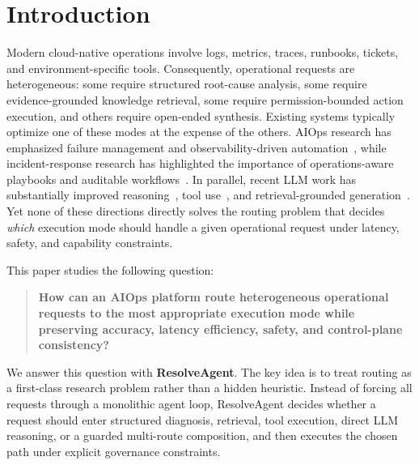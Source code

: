 \documentclass[conference]{IEEEtran}
\begin{document}
\section{Introduction}
Modern cloud-native operations involve logs, metrics, traces, runbooks, tickets, and environment-specific tools. Consequently, operational requests are heterogeneous: some require structured root-cause analysis, some require evidence-grounded knowledge retrieval, some require permission-bounded action execution, and others require open-ended synthesis. Existing systems typically optimize one of these modes at the expense of the others. AIOps research has emphasized failure management and observability-driven automation~\cite{notaro2021aiops}, while incident-response research has highlighted the importance of operations-aware playbooks and auditable workflows~\cite{shaked2023operations}. In parallel, recent LLM work has substantially improved reasoning~\cite{wei2022cot,kojima2022zeroshot}, tool use~\cite{schick2023toolformer}, and retrieval-grounded generation~\cite{ram2023incontext,gao2023rarr,mallen2023trust}. Yet none of these directions directly solves the routing problem that decides \emph{which} execution mode should handle a given operational request under latency, safety, and capability constraints.

This paper studies the following question:
\begin{quote}
\textbf{How can an AIOps platform route heterogeneous operational requests to the most appropriate execution mode while preserving accuracy, latency efficiency, safety, and control-plane consistency?}
\end{quote}

We answer this question with \textbf{ResolveAgent}. The key idea is to treat routing as a first-class research problem rather than a hidden heuristic. Instead of forcing all requests through a monolithic agent loop, ResolveAgent decides whether a request should enter structured diagnosis, retrieval, tool execution, direct LLM reasoning, or a guarded multi-route composition, and then executes the chosen path under explicit governance constraints.
\end{document}
